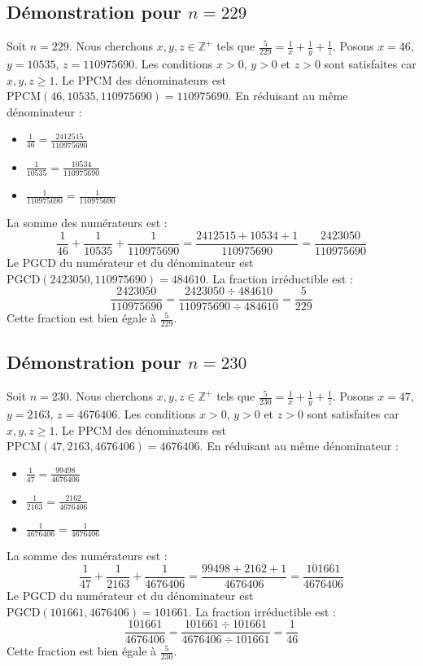 \documentclass[11pt,a4paper]{article}
\begin{document}
\subsection{Démonstration pour $n = 229$}
Soit $n = 229$. Nous cherchons $x, y, z \in \mathbb{Z}^{+}$ tels que $\frac{5}{229} = \frac{1}{x} + \frac{1}{y} + \frac{1}{z}$.
Posons $x = 46$, $y = 10535$, $z = 110975690$.
Les conditions $x > 0$, $y > 0$ et $z > 0$ sont satisfaites car $x, y, z \geq 1$.
Le PPCM des dénominateurs est $\text{PPCM}(46, 10535, 110975690) = 110975690$.
En réduisant au même dénominateur :
\begin{itemize}
    \item $\frac{1}{46} = \frac{2412515}{110975690}$
    \item $\frac{1}{10535} = \frac{10534}{110975690}$
    \item $\frac{1}{110975690} = \frac{1}{110975690}$
\end{itemize}
La somme des numérateurs est :
$$ \frac{1}{46} + \frac{1}{10535} + \frac{1}{110975690} = \frac{2412515 + 10534 + 1}{110975690} = \frac{2423050}{110975690} $$
Le PGCD du numérateur et du dénominateur est $\text{PGCD}(2423050, 110975690) = 484610$.
La fraction irréductible est :
$$ \frac{2423050}{110975690} = \frac{2423050 \div 484610}{110975690 \div 484610} = \frac{5}{229} $$
Cette fraction est bien égale à $\frac{5}{229}$.

\subsection{Démonstration pour $n = 230$}
Soit $n = 230$. Nous cherchons $x, y, z \in \mathbb{Z}^{+}$ tels que $\frac{5}{230} = \frac{1}{x} + \frac{1}{y} + \frac{1}{z}$.
Posons $x = 47$, $y = 2163$, $z = 4676406$.
Les conditions $x > 0$, $y > 0$ et $z > 0$ sont satisfaites car $x, y, z \geq 1$.
Le PPCM des dénominateurs est $\text{PPCM}(47, 2163, 4676406) = 4676406$.
En réduisant au même dénominateur :
\begin{itemize}
    \item $\frac{1}{47} = \frac{99498}{4676406}$
    \item $\frac{1}{2163} = \frac{2162}{4676406}$
    \item $\frac{1}{4676406} = \frac{1}{4676406}$
\end{itemize}
La somme des numérateurs est :
$$ \frac{1}{47} + \frac{1}{2163} + \frac{1}{4676406} = \frac{99498 + 2162 + 1}{4676406} = \frac{101661}{4676406} $$
Le PGCD du numérateur et du dénominateur est $\text{PGCD}(101661, 4676406) = 101661$.
La fraction irréductible est :
$$ \frac{101661}{4676406} = \frac{101661 \div 101661}{4676406 \div 101661} = \frac{1}{46} $$
Cette fraction est bien égale à $\frac{5}{230}$.
\end{document}
